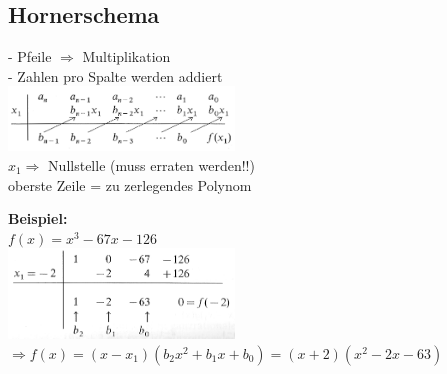 	
			
\subsection{Hornerschema}
	\begin{minipage}[t]{9cm}
		- Pfeile $\Rightarrow$ Multiplikation\\
		- Zahlen pro Spalte werden addiert\\
		\includegraphics[width=6cm]{./bilder/hornerschema_1.png}\\
		$x_1 \Rightarrow$ Nullstelle (muss erraten werden!!)\\
		oberste Zeile = zu zerlegendes Polynom			
	\end{minipage}
	\begin{minipage}[t]{9cm}
		\textbf{Beispiel:}\\
		$f(x) = x^3-67x-126$\\
		\includegraphics[width=6cm]{./bilder/hornerschema_2.png}\\
		$\Rightarrow f(x) = (x-x_1)(b_2x^2 + b_1x + b_0) = (x+2)(x^2-2x-63)$	
	\end{minipage}
\newpage